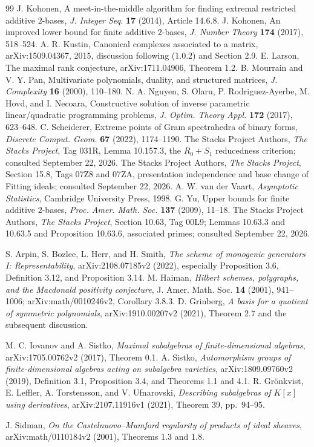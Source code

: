 \begin{thebibliography}{99}
 J. Kohonen, A meet-in-the-middle algorithm for finding extremal restricted additive $2$-bases, \emph{J. Integer Seq.} \textbf{17} (2014), Article 14.6.8.
 J. Kohonen, An improved lower bound for finite additive $2$-bases, \emph{J. Number Theory} \textbf{174} (2017), 518--524.
 A. R. Kustin, Canonical complexes associated to a matrix, arXiv:1509.04367, 2015, discussion following (1.0.2) and Section 2.9.
 E. Larson, The maximal rank conjecture, arXiv:1711.04906, Theorem 1.2.
 B. Mourrain and V. Y. Pan, Multivariate polynomials, duality, and structured matrices, \emph{J. Complexity} \textbf{16} (2000), 110--180.
 N. A. Nguyen, S. Olaru, P. Rodriguez-Ayerbe, M. Hovd, and I. Necoara, Constructive solution of inverse parametric linear/quadratic programming problems, \emph{J. Optim. Theory Appl.} \textbf{172} (2017), 623--648.
 C. Scheiderer, Extreme points of Gram spectrahedra of binary forms, \emph{Discrete Comput. Geom.} \textbf{67} (2022), 1174--1190.
 The Stacks Project Authors, \emph{The Stacks Project}, Tag 031R, Lemma 10.157.3, the $R_0+S_1$ reducedness criterion; consulted September 22, 2026.
 The Stacks Project Authors, \emph{The Stacks Project}, Section 15.8, Tags 07Z8 and 07ZA, presentation independence and base change of Fitting ideals; consulted September 22, 2026.
 A. W. van der Vaart, \emph{Asymptotic Statistics}, Cambridge University Press, 1998.
 G. Yu, Upper bounds for finite additive $2$-bases, \emph{Proc. Amer. Math. Soc.} \textbf{137} (2009), 11--18.
 The Stacks Project Authors, \emph{The Stacks Project}, Section 10.63, Tag 00L9; Lemmas 10.63.3 and 10.63.5 and Proposition 10.63.6, associated primes; consulted September 22, 2026.

 S. Arpin, S. Bozlee, L. Herr, and H. Smith,
\emph{The scheme of monogenic generators I: Representability},
arXiv:2108.07185v2 (2022), especially Proposition 3.6, Definition 3.12,
and Proposition 3.14.
 M. Haiman,
\emph{Hilbert schemes, polygraphs, and the Macdonald positivity conjecture},
J. Amer. Math. Soc. \textbf{14} (2001), 941--1006;
arXiv:math/0010246v2, Corollary 3.8.3.
 D. Grinberg,
\emph{A basis for a quotient of symmetric polynomials},
arXiv:1910.00207v2 (2021), Theorem 2.7 and the subsequent discussion.

 M. C. Iovanov and A. Sistko,
\emph{Maximal subalgebras of finite-dimensional algebras},
arXiv:1705.00762v2 (2017), Theorem 0.1.
 A. Sistko,
\emph{Automorphism groups of finite-dimensional algebras acting on
subalgebra varieties}, arXiv:1809.09760v2 (2019),
Definition 3.1, Proposition 3.4, and Theorems 1.1 and 4.1.
 R. Gr\"onkvist, E. Leffler, A. Torstensson, and V. Ufnarovski,
\emph{Describing subalgebras of $K[x]$ using derivatives},
arXiv:2107.11916v1 (2021), Theorem 39, pp.~94--95.

 J. Sidman,
\emph{On the Castelnuovo--Mumford regularity of products of ideal sheaves},
arXiv:math/0110184v2 (2001), Theorems 1.3 and 1.8.
\end{thebibliography}
